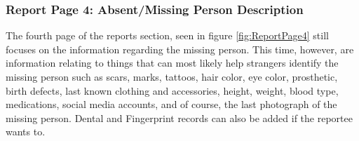 \subsubsection{Report Page 4: Absent/Missing Person Description}

The fourth page of the reports section, seen in figure \ref{fig:ReportPage4} still focuses on the information regarding the missing person. This time, however, are information relating to things that can most likely help strangers identify the missing person such as scars, marks, tattoos, hair color, eye color, prosthetic, birth defects, last known clothing and accessories, height, weight, blood type, medications, social media accounts, and of course, the last photograph of the missing person. Dental and Fingerprint records can also be added if the reportee wants to.


